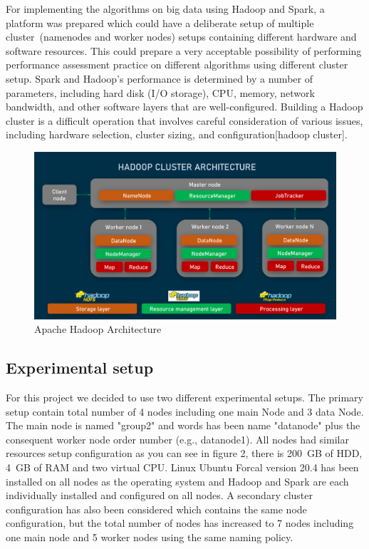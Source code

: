 For implementing the algorithms on big data using Hadoop and Spark, a platform was prepared which could have a deliberate setup of multiple cluster~(namenodes and worker nodes) setups containing different hardware and software resources. This could prepare a very acceptable possibility of performing performance assessment practice on different algorithms using different cluster setup. Spark and Hadoop's performance is determined by a number of parameters, including hard disk (I/O storage), CPU, memory, network bandwidth, and other software layers that are well-configured. Building a Hadoop cluster is a difficult operation that involves careful consideration of various issues, including hardware selection, cluster sizing, and configuration[hadoop cluster].

\begin{figure}[t]
   \centering
   \includegraphics[width=\linewidth]{fig/hadoop_cluster.png}
    \caption{Apache Hadoop Architecture}
    \label{fig:architecture}
\end{figure}


\subsection{Experimental setup}
For this project we decided to use two different experimental setups. The primary setup contain total number of 4 nodes including one main Node and 3 data Node. The main node is named "group2" and words has been name "datanode" plus the consequent worker node order number (e.g., datanode1). All nodes had similar resources setup configuration as you can see in figure 2, there is 200~GB of HDD, 4~GB of RAM and two virtual CPU. Linux Ubuntu Forcal version 20.4 has been installed on all nodes as the operating system and Hadoop and Spark are each individually installed and configured on all nodes.
A secondary cluster configuration has also been considered which contains the same node configuration, but the total number of nodes has increased to 7 nodes including one main node and 5 worker nodes using the same naming policy.


